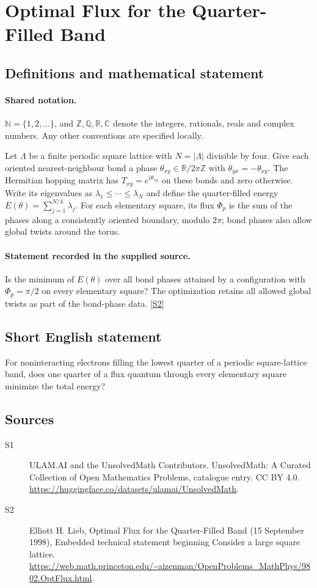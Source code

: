 \documentclass[11pt]{article}
\newcommand{\sref}[2]{\hyperlink{source:#1:#2}{[S#2]}}
\begin{document}
\section{Optimal Flux for the Quarter-Filled Band}\label{statement}

\subsection{Definitions and mathematical statement}

\paragraph{Shared notation.}$\mathbb N=\{1,2,\ldots\}$, and $\mathbb Z,\mathbb Q,\mathbb R,\mathbb C$ denote the integers, rationals, reals and complex numbers. Any other conventions are specified locally.


Let $\Lambda$ be a finite periodic square lattice with $N=|\Lambda|$ divisible by four. Give each oriented nearest-neighbour bond a phase $\theta_{xy}\in\mathbb R/2\pi\mathbb Z$ with $\theta_{yx}=-\theta_{xy}$. The Hermitian hopping matrix has $T_{xy}=e^{i\theta_{xy}}$ on these bonds and zero otherwise. Write its eigenvalues as $\lambda_1\le\cdots\le\lambda_N$ and define the quarter-filled energy $E(\theta)=\sum_{j=1}^{N/4}\lambda_j$. For each elementary square, its flux $\Phi_p$ is the sum of the phases along a consistently oriented boundary, modulo $2\pi$; bond phases also allow global twists around the torus.
\paragraph{Statement recorded in the supplied source.}
Is the minimum of $E(\theta)$ over all bond phases attained by a configuration with $\Phi_p=\pi/2$ on every elementary square? The optimization retains all allowed global twists as part of the bond-phase data. \sref{statement}{2}
\subsection{Short English statement}
For noninteracting electrons filling the lowest quarter of a periodic square-lattice band, does one quarter of a flux quantum through every elementary square minimize the total energy?
\subsection{Sources}
\begin{description}
\item[\hypertarget{source:statement:1}{S1}] ULAM.AI and the UnsolvedMath Contributors, UnsolvedMath: A Curated Collection of Open Mathematics Problems, catalogue entry. CC BY 4.0. \url{https://huggingface.co/datasets/ulamai/UnsolvedMath}.
\item[\hypertarget{source:statement:2}{S2}] Elliott H. Lieb, Optimal Flux for the Quarter-Filled Band (15 September 1998), Embedded technical statement beginning Consider a large square lattice. \url{https://web.math.princeton.edu/~aizenman/OpenProblems_MathPhys/9802.OptFlux.html}.
\end{description}
\label{end:statement}
\end{document}
